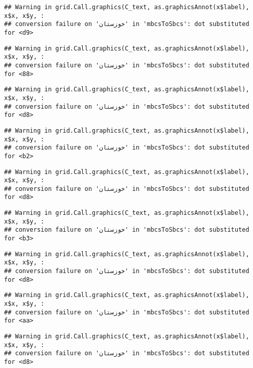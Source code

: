 \documentclass[
]{article}
\begin{document}
\begin{verbatim}
## Warning in grid.Call.graphics(C_text, as.graphicsAnnot(x$label), x$x, x$y, :
## conversion failure on 'خوزستان' in 'mbcsToSbcs': dot substituted for <d9>
\end{verbatim}

\begin{verbatim}
## Warning in grid.Call.graphics(C_text, as.graphicsAnnot(x$label), x$x, x$y, :
## conversion failure on 'خوزستان' in 'mbcsToSbcs': dot substituted for <88>
\end{verbatim}

\begin{verbatim}
## Warning in grid.Call.graphics(C_text, as.graphicsAnnot(x$label), x$x, x$y, :
## conversion failure on 'خوزستان' in 'mbcsToSbcs': dot substituted for <d8>
\end{verbatim}

\begin{verbatim}
## Warning in grid.Call.graphics(C_text, as.graphicsAnnot(x$label), x$x, x$y, :
## conversion failure on 'خوزستان' in 'mbcsToSbcs': dot substituted for <b2>
\end{verbatim}

\begin{verbatim}
## Warning in grid.Call.graphics(C_text, as.graphicsAnnot(x$label), x$x, x$y, :
## conversion failure on 'خوزستان' in 'mbcsToSbcs': dot substituted for <d8>
\end{verbatim}

\begin{verbatim}
## Warning in grid.Call.graphics(C_text, as.graphicsAnnot(x$label), x$x, x$y, :
## conversion failure on 'خوزستان' in 'mbcsToSbcs': dot substituted for <b3>
\end{verbatim}

\begin{verbatim}
## Warning in grid.Call.graphics(C_text, as.graphicsAnnot(x$label), x$x, x$y, :
## conversion failure on 'خوزستان' in 'mbcsToSbcs': dot substituted for <d8>
\end{verbatim}

\begin{verbatim}
## Warning in grid.Call.graphics(C_text, as.graphicsAnnot(x$label), x$x, x$y, :
## conversion failure on 'خوزستان' in 'mbcsToSbcs': dot substituted for <aa>
\end{verbatim}

\begin{verbatim}
## Warning in grid.Call.graphics(C_text, as.graphicsAnnot(x$label), x$x, x$y, :
## conversion failure on 'خوزستان' in 'mbcsToSbcs': dot substituted for <d8>
\end{verbatim}
\end{document}
